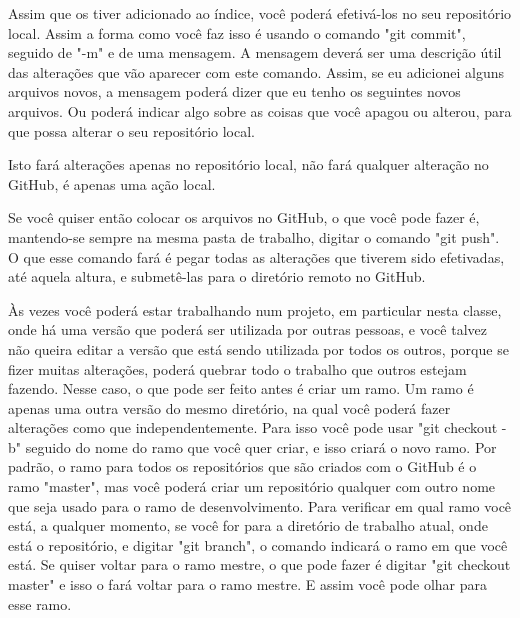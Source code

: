 Assim que os tiver adicionado ao índice, você poderá efetivá-los no seu repositório local. Assim a forma como você faz isso é usando o comando "git commit", seguido de "-m" e de uma mensagem. A mensagem deverá ser uma descrição útil das alterações que vão aparecer com este comando. Assim, se eu adicionei alguns arquivos novos, a mensagem poderá dizer que eu tenho os seguintes novos arquivos. Ou poderá indicar algo sobre as coisas que você apagou ou alterou, para que possa alterar o seu repositório local. 

Isto fará alterações apenas no repositório local, não fará qualquer alteração no GitHub, é apenas uma ação local. 

Se você quiser então colocar os arquivos no GitHub, o que você pode fazer é, mantendo-se sempre na mesma pasta de trabalho, digitar o comando "git push". O que esse comando fará é pegar todas as alterações que tiverem sido efetivadas, até aquela altura, e submetê-las para o diretório remoto no GitHub. 

Às vezes você poderá estar trabalhando num projeto, em particular nesta classe, onde há uma versão que poderá ser utilizada por outras pessoas, e você talvez não queira editar a versão que está sendo utilizada por todos os outros, porque se fizer muitas alterações, poderá quebrar todo o trabalho que outros estejam fazendo.  Nesse caso, o que pode ser feito antes é criar um ramo. Um ramo é apenas uma outra versão do mesmo diretório, na qual você poderá fazer alterações como que independentemente. Para isso você pode usar "git checkout -b" seguido do nome do ramo que você quer criar, e isso criará o novo ramo. Por padrão, o ramo para todos os repositórios que são criados com o GitHub é o ramo "master", mas você poderá criar um repositório qualquer com outro nome que seja usado para o ramo de desenvolvimento. Para verificar em qual ramo você está, a qualquer momento, se você for para a diretório de trabalho atual, onde está o repositório, e digitar "git branch", o comando indicará o ramo em que você está. Se quiser voltar para o ramo mestre, o que pode fazer é digitar "git checkout master" e isso o fará voltar para o ramo mestre. E assim você pode olhar para esse ramo. 


